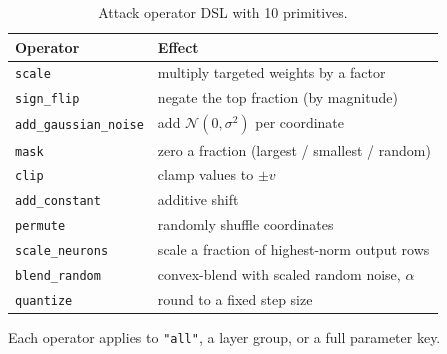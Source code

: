 \documentclass[conference,9pt]{IEEEtran}
\begin{document}
\begin{table}[!ht]
\caption{Attack operator DSL with 10 primitives.}
\label{tab:ops}
\centering
\small
\begin{tabular}{@{}ll@{}}
\toprule
\textbf{Operator} & \textbf{Effect} \\
\midrule
\texttt{scale} & multiply targeted weights by a factor \\
\texttt{sign\_flip} & negate the top fraction (by magnitude) \\
\texttt{add\_gaussian\_noise} & add $\mathcal{N}(0,\sigma^2)$ per coordinate \\
\texttt{mask} & zero a fraction (largest / smallest / random) \\
\texttt{clip} & clamp values to $\pm v$ \\
\texttt{add\_constant} & additive shift \\
\texttt{permute} & randomly shuffle coordinates \\
\texttt{scale\_neurons} & scale a fraction of highest-norm output rows \\
\texttt{blend\_random} & convex-blend with scaled random noise, $\alpha$ \\
\texttt{quantize} & round to a fixed step size \\
\bottomrule
\end{tabular}
\vspace{1mm}

\small Each operator applies to \texttt{"all"}, a layer group, or a full parameter key.
\end{table}
\end{document}
